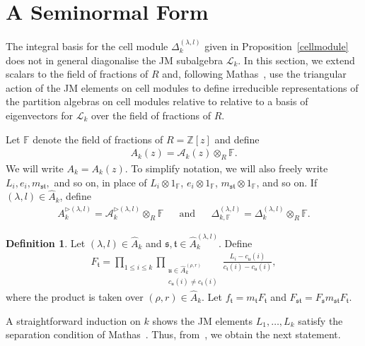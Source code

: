 \documentclass[11pt,a4paper,reqno,svgnames]{amsart}
\theoremstyle{plain}
\theoremstyle{definition}
\newtheorem{definition}[theorem]{Definition}
\numberwithin{equation}{section}
\begin{document}
\section{A Seminormal Form}\label{s-n-s}
The integral basis for the cell module $\Delta_{k}^{(\lambda,l)}$ given in Proposition~\ref{cellmodule} does not in general diagonalise the JM subalgebra $\mathscr{L}_k$. In this section, we extend scalars to the field of fractions of $R$ and, following Mathas~\cite{MR2414949}, use the triangular action of the JM elements on cell modules to define irreducible representations of the partition algebras on cell modules relative to relative to a basis of eigenvectors for $\mathscr{L}_k$ over the field of fractions of $R$.

Let $\mathbb{F}$ denote the field of fractions of $R=\mathbb{Z}[z]$ and define
\begin{align*}
A_{k}(z)=\mathcal{A}_{k}(z)\otimes_R \mathbb{F}.
\end{align*}
We will write $A_k=A_k(z)$. To simplify notation, we will also freely write $L_i,e_{i},m_\mathfrak{st},$ and so on, in place of $L_i\otimes 1_\mathbb{F}$, $e_i\otimes 1_\mathbb{F}$, $m_\mathfrak{st}\otimes 1_\mathbb{F}$, and so on.  If $(\lambda,{l})\in\hat{A}_k$, define  
\begin{align*}
A_{k}^{\rhd(\lambda,{l})}=\mathcal{A}_{k}^{\rhd(\lambda,{l})}\otimes_R \mathbb{F}
&&\text{and}&&\Delta_{k,\mathbb{F}}^{(\lambda,l)}=\Delta_{k}^{(\lambda,l)}\otimes_R \mathbb{F}.
\end{align*}
\begin{definition}\label{basis:1}
Let $(\lambda,{l})\in\hat{A}_k$ and   $\mathfrak{s,t}\in\hat{A}_{k}^{(\lambda,{l})}$. Define
\begin{align*}
F_\mathfrak{t}=
\prod_{
1{\leqslant} i{\leqslant} k
}
\prod_{
\substack{
\mathfrak{u}\in\hat{A}_{k}^{(\rho,r)}\\
c_\mathfrak{u}(i)\ne c_\mathfrak{t}(i)}}
\frac{L_i-c_\mathfrak{u}(i)}{c_\mathfrak{t}(i)-c_\mathfrak{u}(i)},
\end{align*}
where the product is taken over $(\rho,r)\in\hat{A}_k$. Let $f_\mathfrak{t}=m_\mathfrak{t}F_\mathfrak{t}$ and $F_{\mathfrak{s}\mathfrak{t}}=F_\mathfrak{s} m_\mathfrak{st} F_\mathfrak{t}$.
\end{definition}
A straightforward induction on $k$ shows the JM elements $L_1,\ldots,L_k$ satisfy the separation condition of Mathas~\cite[Definition~2.8]{MR2414949}. Thus, from~\cite[Sect.~3]{MR2414949}, we obtain the next statement. 
\end{document}
